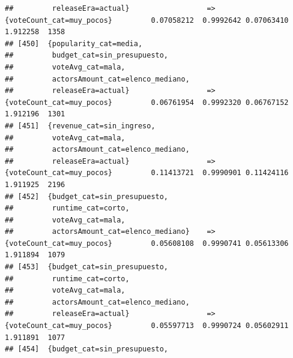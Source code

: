 \documentclass[
]{article}
\begin{document}
\begin{verbatim}
##         releaseEra=actual}                  => {voteCount_cat=muy_pocos}         0.07058212  0.9992642 0.07063410 1.912258  1358
## [450]  {popularity_cat=media,                                                                                                   
##         budget_cat=sin_presupuesto,                                                                                             
##         voteAvg_cat=mala,                                                                                                       
##         actorsAmount_cat=elenco_mediano,                                                                                        
##         releaseEra=actual}                  => {voteCount_cat=muy_pocos}         0.06761954  0.9992320 0.06767152 1.912196  1301
## [451]  {revenue_cat=sin_ingreso,                                                                                                
##         voteAvg_cat=mala,                                                                                                       
##         actorsAmount_cat=elenco_mediano,                                                                                        
##         releaseEra=actual}                  => {voteCount_cat=muy_pocos}         0.11413721  0.9990901 0.11424116 1.911925  2196
## [452]  {budget_cat=sin_presupuesto,                                                                                             
##         runtime_cat=corto,                                                                                                      
##         voteAvg_cat=mala,                                                                                                       
##         actorsAmount_cat=elenco_mediano}    => {voteCount_cat=muy_pocos}         0.05608108  0.9990741 0.05613306 1.911894  1079
## [453]  {budget_cat=sin_presupuesto,                                                                                             
##         runtime_cat=corto,                                                                                                      
##         voteAvg_cat=mala,                                                                                                       
##         actorsAmount_cat=elenco_mediano,                                                                                        
##         releaseEra=actual}                  => {voteCount_cat=muy_pocos}         0.05597713  0.9990724 0.05602911 1.911891  1077
## [454]  {budget_cat=sin_presupuesto,                                                                                             

\end{verbatim}
\end{document}
